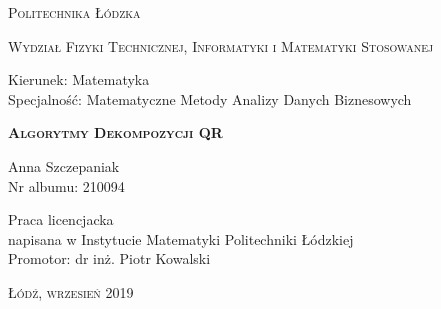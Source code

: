 \documentclass[12pt,a4paper]{report}
\begin{document}
\begin{titlepage}
\begin{flushleft}
\end{flushleft}
\begin{center}
\textsc{{\huge Politechnika Łódzka}}
\end{center}
\bigskip
\bigskip
\begin{center}
\textsc{{\Large Wydział Fizyki Technicznej, Informatyki i Matematyki Stosowanej}}
\end{center}
\bigskip
\bigskip
\begin{Large}
Kierunek: Matematyka\\   
Specjalność: Matematyczne Metody Analizy Danych Biznesowych %

\end{Large}
\bigskip
\bigskip
\bigskip
\bigskip
\noindent\hrulefill
\begin{center}
\textsc{\textbf{{\Large Algorytmy Dekompozycji QR %
\\}}}
\end{center}
\bigskip
\bigskip
\begin{flushright}
{\large 
Anna Szczepaniak %
\\
Nr albumu: 
210094 %
\\}
\end{flushright}
\noindent\hrulefill
\bigskip
\bigskip
\bigskip
\bigskip
\begin{center}
{\large Praca licencjacka\\ %
napisana w Instytucie Matematyki Politechniki Łódzkiej\\ 
\bigskip
\bigskip
\bigskip
\bigskip
Promotor: dr inż. Piotr Kowalski %
 }
\end{center}
\bigskip
\bigskip
\bigskip
\bigskip
\begin{center}
{\textsc{\large Łódź, wrzesień 2019 %
}}
\end{center}
\end{titlepage}



\tableofcontents
\end{document}

